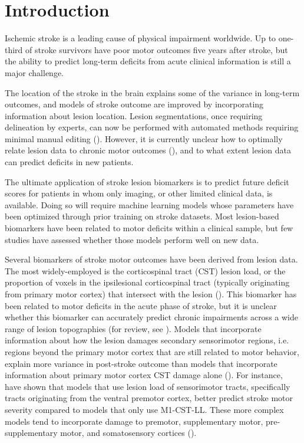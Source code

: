 \documentclass[10pt]{article}
\begin{document}
\section{Introduction}
Ischemic stroke is a leading cause of physical impairment worldwide. Up to one-third of stroke survivors have poor motor outcomes five years after stroke, but the ability to predict long-term deficits from acute clinical information is still a major challenge.

The location of the stroke in the brain explains some of the variance in long-term outcomes, and models of stroke outcome are improved by incorporating information about lesion location. Lesion segmentations, once requiring  delineation by experts, can now be performed with automated methods requiring minimal manual editing (\cite{Pustina2016-qu}). However, it is currently unclear how to optimally relate lesion data to chronic motor outcomes (\cite{Sperber2020-kp, Kasties2021-rm}), and to what extent lesion data can predict deficits in new patients.

The ultimate application of stroke lesion biomarkers is to predict future deficit scores for patients in whom only imaging, or other limited clinical data, is available. Doing so will require machine learning models whose parameters have been optimized through prior training on stroke datasets. Most lesion-based biomarkers have been related to motor deficits within a clinical sample, but few studies have assessed whether those models perform well on new data.

Several biomarkers of stroke motor outcomes have been derived from lesion data. The most widely-employed is the corticospinal tract (CST) lesion load, or the proportion of voxels in the ipsilesional corticospinal tract (typically originating from primary motor cortex) that intersect with the lesion (\cite{Zhu2010-qh, Feng2015-du, Findlater2019-je}). This biomarker has been related to motor deficits in the acute phase of stroke, but it is unclear whether this biomarker can accurately predict chronic impairments across a wide range of lesion topographies (for review, see \cite{Kim2017-xe}). Models that incorporate information about how the lesion damages secondary sensorimotor regions, i.e. regions beyond the primary motor cortex that are still related to motor behavior, explain more variance in post-stroke outcome than models that incorporate information about primary motor cortex CST damage alone (\cite{Ito2022-em, Sperber2021-lw, Rondina2016-ds, Rondina2017-ij, Schulz2012-yy}). For instance, \cite{Ito2022-em} have shown that models that use lesion load of sensorimotor tracts, specifically tracts originating from the ventral premotor cortex, better predict stroke motor severity compared to models that only use M1-CST-LL. These more complex models tend to incorporate damage to premotor, supplementary motor, pre-supplementary motor, and somatosensory cortices (\cite{Ito2022-em,Schulz2012-yy, Sperber2021-lw, Rondina2016-ds, Rondina2017-ij}).
\end{document}
